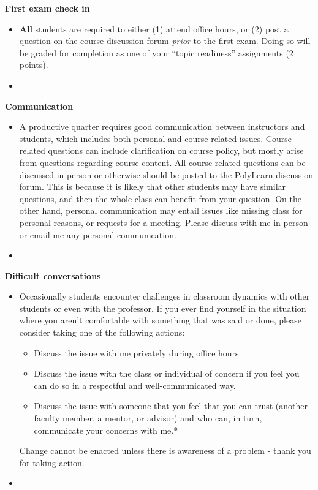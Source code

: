 \documentclass[letterpaper,12pt]{report}
\begin{document}
\textbf{First exam check in}
\begin{itemize}
\item[]
\textbf{All} students are required to either (1) attend office hours, or (2) post a question on the course discussion forum \emph{prior} to the first exam.  Doing so will be graded for completion as one of your ``topic readiness'' assignments (2 points).
\item[]
\end{itemize}

\textbf{Communication}
\begin{itemize}
\item[]
A productive quarter requires good communication between instructors and students, which includes both personal and course related issues. Course related questions can include clarification on course policy, but mostly arise from questions regarding course content. All course related questions can be discussed in person or otherwise should be posted to the PolyLearn discussion forum. This is because it is likely that other students may have similar questions, and then the whole class can benefit from your question. On the other hand, personal communication may entail issues like missing class for personal reasons, or requests for a meeting. Please discuss with me in person or email me any personal communication.
\item[]
\end{itemize}

\textbf{Difficult conversations}
\begin{itemize}
\item[]
Occasionally students encounter challenges in classroom dynamics with other students or even with the professor.  If you ever find yourself in the situation where you aren't comfortable with something that was said or done, please consider taking one of the following actions:
\begin{itemize}
\item Discuss the issue with me privately during office hours.
\item Discuss the issue with the class or individual of concern if you feel you can do so in a respectful and well-communicated way.
\item Discuss the issue with someone that you feel that you can trust (another faculty member, a mentor, or advisor) and who can, in turn, communicate your concerns with me.*
\end{itemize}
Change cannot be enacted unless there is awareness of a problem - thank you for taking action.
\item[]
\end{itemize}
\end{document}
